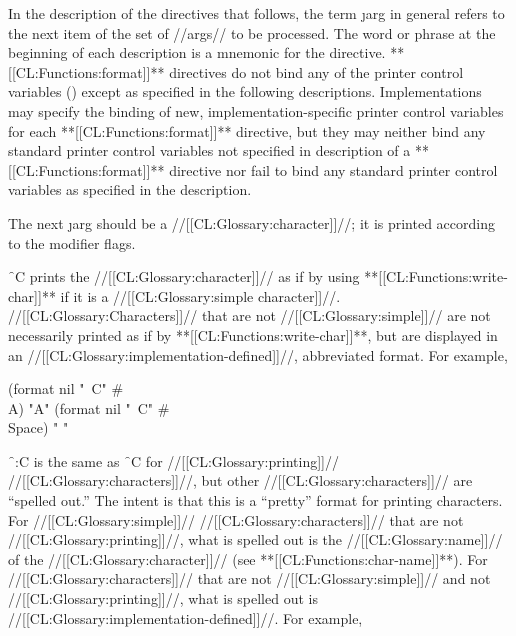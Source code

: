 In the description of the directives that follows,
the term \j{arg} in general
refers to the next item of the set of //args// to be processed.
The word or phrase at the beginning of each description is a mnemonic
for the directive.
**[[CL:Functions:format]]** directives do not bind any of the printer control
variables () except as specified in the following
descriptions.
   Implementations may specify the binding of new, implementation-specific 
printer control variables for each **[[CL:Functions:format]]** directive, but they
    may neither bind any standard printer control variables not
    specified in description of a **[[CL:Functions:format]]** 
directive nor fail to bind
    any standard printer control variables as specified in the
    description.













               
The next \j{arg} should be a //[[CL:Glossary:character]]//; 
it is printed
according to the modifier flags.



\f{~C} prints the //[[CL:Glossary:character]]// 
as if by using **[[CL:Functions:write-char]]** if it is a //[[CL:Glossary:simple character]]//.
//[[CL:Glossary:Characters]]// that are not //[[CL:Glossary:simple]]//
are not necessarily printed as if by **[[CL:Functions:write-char]]**,
but are displayed in an //[[CL:Glossary:implementation-defined]]//, abbreviated format.
For example,

\code
 (format nil "~C" #\\A) \EV "A"
 (format nil "~C" #\\Space) \EV " "
\endcode



\f{~:C} is the same as \f{~C} for //[[CL:Glossary:printing]]// //[[CL:Glossary:characters]]//,
but other //[[CL:Glossary:characters]]// are ``spelled out.''  The intent is that this
is a ``pretty'' format for printing characters.
For //[[CL:Glossary:simple]]// //[[CL:Glossary:characters]]// that are not //[[CL:Glossary:printing]]//,
what is spelled out is the //[[CL:Glossary:name]]// of the //[[CL:Glossary:character]]// (see **[[CL:Functions:char-name]]**).
For //[[CL:Glossary:characters]]// that are not //[[CL:Glossary:simple]]// and not //[[CL:Glossary:printing]]//,
what is spelled out is //[[CL:Glossary:implementation-defined]]//.
For example, 

